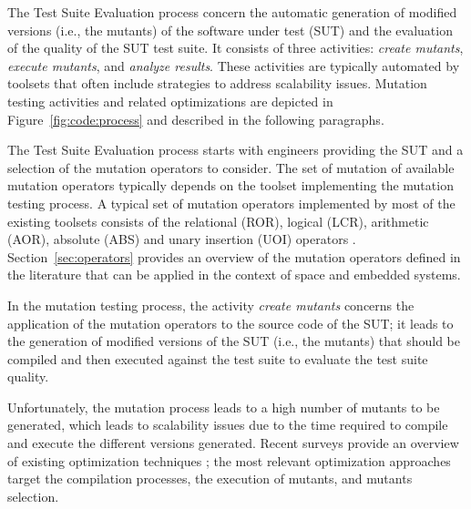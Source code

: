 The Test Suite Evaluation process concern the automatic generation of modified versions (i.e., the mutants) of the software under test (SUT) and the evaluation of the quality of the SUT test suite. It consists of three activities: \emph{create mutants}, \emph{execute mutants}, and \emph{analyze results}. 
These activities are typically automated by toolsets that often include strategies to address scalability issues. Mutation testing activities and related optimizations are depicted in Figure~\ref{fig:code:process} and described in the following paragraphs.

The Test Suite Evaluation process starts with engineers providing the SUT and a selection of the mutation operators to consider. The set of mutation of available mutation operators typically depends on the toolset implementing the mutation testing process. 
A typical set of mutation operators implemented by most of the existing toolsets consists of the relational (ROR), logical (LCR), arithmetic (AOR), absolute (ABS) and unary insertion (UOI) operators \cite{rothermel1996experimental}. 
Section~\ref{sec:operators} provides an overview of the mutation operators defined in the literature that can be applied in the context of space and embedded systems.

In the mutation testing process, the activity \emph{create mutants} concerns the application of the mutation operators to the source code of the SUT; it leads to the generation of modified versions of the SUT (i.e., the mutants) that should be compiled and then executed against the test suite to evaluate the test suite quality. 

Unfortunately, the mutation process leads to a high number of mutants to be generated, which leads to scalability issues due to the time required to compile and execute the different versions generated. Recent surveys provide an overview of existing optimization techniques \cite{ferrari2018systematic}; the most relevant optimization approaches target the compilation processes, the execution of mutants, and mutants selection. 

